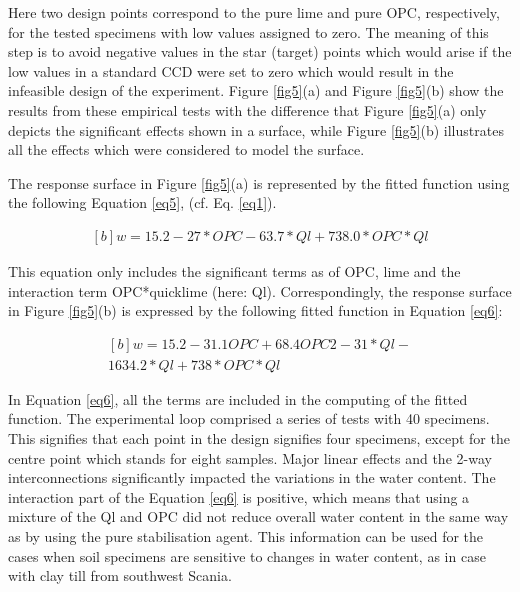 \documentclass[eprint,
]{actapoly}
\begin{document}
Here two design points correspond to the pure lime and pure OPC, respectively, for the tested specimens with low values assigned to zero. The meaning of this step is to avoid negative values in the star (target) points which would arise if the low values in a standard CCD were set to zero which would result in the infeasible design of the experiment. Figure \ref{fig5}(a) and Figure \ref{fig5}(b) show the results from these empirical tests with the difference that Figure \ref{fig5}(a) only depicts the significant effects shown in a surface, while Figure \ref{fig5}(b) illustrates all the effects which were considered to model the surface. 

The response surface in Figure \ref{fig5}(a) is represented by the fitted function using the following Equation \ref{eq5}, (cf. Eq. \ref{eq1}). 

\begin{equation}\label{eq5}
\begin{aligned}[b]
w=15.2 -27*OPC-63.7*Ql+738.0*OPC*Ql 
\end{aligned}
\end{equation}

This equation only includes the significant terms as of OPC, lime and the interaction term OPC*quicklime (here: Ql). Correspondingly, the response surface in Figure \ref{fig5}(b) is expressed by the following fitted function in Equation \ref{eq6}:

\begin{equation}\label{eq6}
\begin{aligned}[b]
w=15.2-31.1OPC+68.4OPC2-31*Ql-\\1634.2*Ql+738*OPC*Ql
\end{aligned}
\end{equation}

In Equation \ref{eq6}, all the terms are included in the computing of the fitted function. The experimental loop comprised a series of tests with 40 specimens. This signifies that each point in the design signifies four specimens, except for the centre point which stands for eight samples. Major linear effects and the 2-way interconnections significantly impacted the variations in the water content. The interaction part of the Equation \ref{eq6} is positive, which means that using a mixture of the Ql and OPC did not reduce overall water content in the same way as by using the pure stabilisation agent. This information can be used for the cases when soil specimens are sensitive to changes in water content, as in case with clay till from southwest Scania. 
\end{document}
